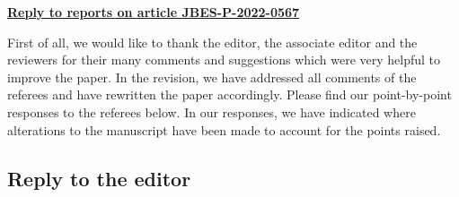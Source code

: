 \documentclass[a4paper,12pt]{article}
\begin{document}
\begin{center}
\underline{\Large\textbf{{Reply to reports on article JBES-P-2022-0567}}}\end{center}
\vspace{10pt}


First of all, we would like to thank the editor, the associate editor and the reviewers for their many comments and suggestions which were very helpful to improve the paper. In the revision, we have addressed all comments of the referees and have rewritten the paper accordingly.
Please find our point-by-point responses to the referees below. In our responses, we have indicated where alterations to the manuscript have been made to account for the points raised. 



\subsection*{Reply to the editor}
\end{document}
